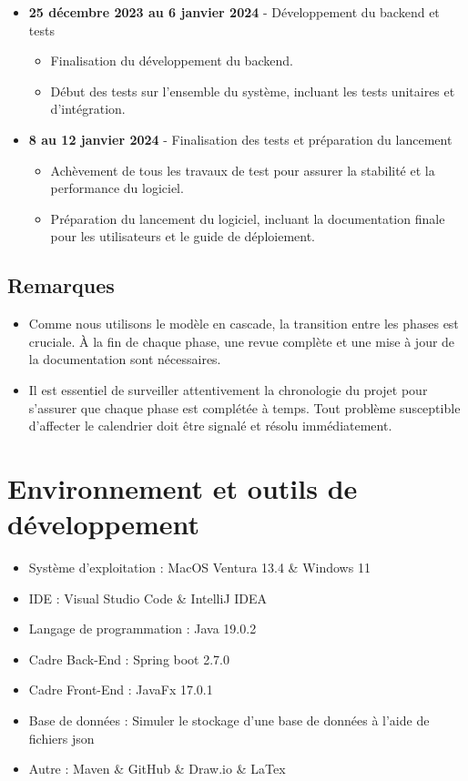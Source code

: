 \documentclass{article}
\begin{document}
\begin{itemize}
    \item \textbf{25 décembre 2023 au 6 janvier 2024} - Développement du backend et tests
    \begin{itemize}
        \item Finalisation du développement du backend.
        \item Début des tests sur l'ensemble du système, incluant les tests unitaires et d'intégration.
    \end{itemize}

    \item \textbf{8 au 12 janvier 2024} - Finalisation des tests et préparation du lancement
    \begin{itemize}
        \item Achèvement de tous les travaux de test pour assurer la stabilité et la performance du logiciel.
        \item Préparation du lancement du logiciel, incluant la documentation finale pour les utilisateurs et le guide de déploiement.
    \end{itemize}
\end{itemize}

\subsection{Remarques}

\begin{itemize}
    \item Comme nous utilisons le modèle en cascade, la transition entre les phases est cruciale. À la fin de chaque phase, une revue complète et une mise à jour de la documentation sont nécessaires.
    \item Il est essentiel de surveiller attentivement la chronologie du projet pour s'assurer que chaque phase est complétée à temps. Tout problème susceptible d'affecter le calendrier doit être signalé et résolu immédiatement.
\end{itemize}

\section{Environnement et outils de développement}
\begin{itemize}
    \item Système d'exploitation : MacOS Ventura 13.4 \& Windows 11
    \item IDE : Visual Studio Code \& IntelliJ IDEA
    \item Langage de programmation : Java 19.0.2
    \item Cadre Back-End : Spring boot 2.7.0
    \item Cadre Front-End : JavaFx 17.0.1
    \item Base de données : Simuler le stockage d'une base de données à l'aide de fichiers json
    \item Autre : Maven \& GitHub \& Draw.io \& LaTex
\end{itemize}
\end{document}
